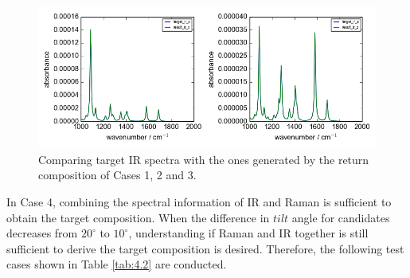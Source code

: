 \begin{figure}[!ht]
\centering
\includegraphics[scale=0.7]{Figures/ir_xz_result_plotting_remove_space.png}
\caption{Comparing target IR spectra with the ones generated by the return composition of Cases 1, 2 and 3.}  \label{fig:4.1}
\end{figure}

In Case 4, combining the spectral information of IR and Raman is sufficient to obtain the target composition. When the difference in $tilt$ angle for candidates decreases from $20^{\circ}$ to $10^{\circ}$, understanding if Raman and IR together is still sufficient to derive the target composition is desired. Therefore, the following test cases shown in Table \ref{tab:4.2} are conducted. \\

